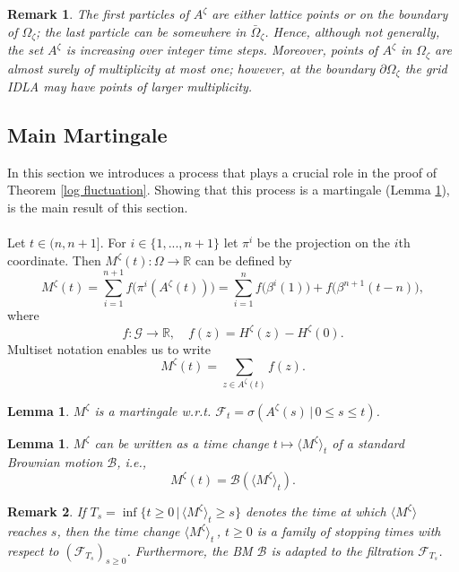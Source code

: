 \documentclass[11pt]{article}
\numberwithin{equation}{section}
\def\OZ{\Omega_{\zeta}}
\def\AZT{A^{\zeta}(t)}
\def\MZT{M^{\zeta}(t)}
\def\QVT{\langle M^{\zeta} \rangle_t}
\newtheorem{lemma}[theorem]{Lemma}
\newtheorem*{remark}{Remark}
\begin{document}
\begin{remark}
  The first particles of $A^{\zeta}$ 
  are either lattice points or on the boundary of $\OZ$; 
  the last particle can be somewhere in $\bar{\Omega}_{\zeta}$. 
  Hence, although not generally, the set $A^{\zeta}$ is 
  increasing over integer time steps.
  Moreover, points of $A^{\zeta}$ in $\OZ$ are almost surely
  of multiplicity at most one; however, at the boundary $\partial \OZ$ 
  the grid IDLA may have points of larger multiplicity. 
\end{remark}


\subsection{Main Martingale} 
\label{sec: define the martingale}
In this section we introduces a process that plays a crucial
role in the proof of Theorem \ref{log fluctuation}. 
Showing that this process is a martingale (Lemma \ref{lemma M : martingale}), 
is the main result of this section.\\~\\
Let $t \in (n,n+1]$. For $i \in \{1,...,n+1\}$ let $\pi^i$ be 
the projection on the $i$th coordinate. 
Then $\MZT : \Omega \rightarrow \mathbb{R}$ can be defined by
\begin{equation}
  \label{D: MZT}
  \MZT = \sum_{i=1}^{n+1} f \big( \pi^i(\AZT) \big) 
          = \sum_{i=1}^{n} f \big(\beta^i(1) \big) + f \big(\beta^{n+1}(t-n) \big),
\end{equation}
where 
  $$f: \mathcal{G} \rightarrow \mathbb{R}, \quad f(z) = H^{\zeta}(z)- H^{\zeta}(0).$$
Multiset notation enables us to write  
 $$
  M^{\zeta}(t) = \sum_{z \in A^{\zeta}(t)} f(z).
 $$

\begin{lemma}
  \label{lemma M : martingale}
  $M^{\zeta}$ is a martingale w.r.t. 
  $\mathcal{F}_t = \sigma(A^{\zeta}(s) \,|\, 0 \leq s \leq t)$.
\end{lemma}

\begin{lemma}\label{L: M as BM}
  $M^{\zeta}$ can be written as a time change 
  $t \mapsto \QVT$ of a standard Brownian motion $\mathcal{B}$, i.e.,
  \begin{equation}\nonumber
    \MZT = \mathcal{B}(\QVT).
  \end{equation}
\end{lemma}

\begin{remark}
  If $T_s = \inf \{ t \geq 0 \,|\, \langle M^{\zeta} \rangle _t \geq s \}$
  denotes the time at which $\langle M^{\zeta} \rangle$ reaches $s$, 
  then the time change $\langle M^{\zeta} \rangle _t\,$, $t \geq 0$
  is a family of stopping times with respect to 
  $(\mathcal{F}_{T_s})_{s \geq 0}$. Furthermore, the BM $\mathcal{B}$ is adapted 
  to the filtration $\mathcal{F}_{T_s}$.
\end{remark}
\end{document}
